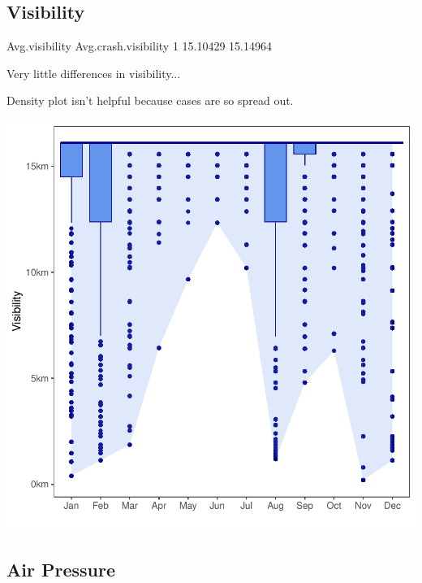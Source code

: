 \documentclass[11pt, a4paper]{article}
\begin{document}
\pagebreak
\subsection{Visibility}

\begin{Schunk}
\begin{Soutput}
  Avg.visibility Avg.crash.visibility
1       15.10429             15.14964
\end{Soutput}
\begin{Soutput}
Very little differences in visibility...
\end{Soutput}
\begin{Soutput}
Density plot isn't helpful because cases are so spread out.
\end{Soutput}
\end{Schunk}

\includegraphics{variableinvestigation-018}



\pagebreak
\subsection{Air Pressure}
\end{document}
